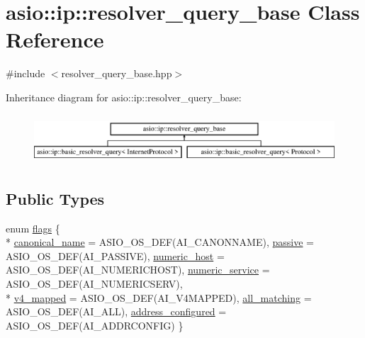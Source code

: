 \hypertarget{classasio_1_1ip_1_1resolver__query__base}{}\section{asio\+:\+:ip\+:\+:resolver\+\_\+query\+\_\+base Class Reference}
\label{classasio_1_1ip_1_1resolver__query__base}


{\ttfamily \#include $<$resolver\+\_\+query\+\_\+base.\+hpp$>$}

Inheritance diagram for asio\+:\+:ip\+:\+:resolver\+\_\+query\+\_\+base\+:\begin{figure}[H]
\begin{center}
\leavevmode
\includegraphics[height=1.860465cm]{classasio_1_1ip_1_1resolver__query__base}
\end{center}
\end{figure}
\subsection*{Public Types}
\begin{DoxyCompactItemize}
\item 
enum \hyperlink{classasio_1_1ip_1_1resolver__query__base_a458691242de07dc542fd9834f7b15cfe}{flags} \{ \\*
\hyperlink{classasio_1_1ip_1_1resolver__query__base_a458691242de07dc542fd9834f7b15cfea02d6078efc9d694dc98b8529d3649289}{canonical\+\_\+name} = A\+S\+I\+O\+\_\+\+O\+S\+\_\+\+D\+E\+F(A\+I\+\_\+\+C\+A\+N\+O\+N\+N\+A\+M\+E), 
\hyperlink{classasio_1_1ip_1_1resolver__query__base_a458691242de07dc542fd9834f7b15cfea2b72b18f2bf20dd05242e133e3a6cb79}{passive} = A\+S\+I\+O\+\_\+\+O\+S\+\_\+\+D\+E\+F(A\+I\+\_\+\+P\+A\+S\+S\+I\+V\+E), 
\hyperlink{classasio_1_1ip_1_1resolver__query__base_a458691242de07dc542fd9834f7b15cfea298ed0afafa60ec6218d6d9c8f227316}{numeric\+\_\+host} = A\+S\+I\+O\+\_\+\+O\+S\+\_\+\+D\+E\+F(A\+I\+\_\+\+N\+U\+M\+E\+R\+I\+C\+H\+O\+S\+T), 
\hyperlink{classasio_1_1ip_1_1resolver__query__base_a458691242de07dc542fd9834f7b15cfea7c911b858cf35654d565287b8ac8aa37}{numeric\+\_\+service} = A\+S\+I\+O\+\_\+\+O\+S\+\_\+\+D\+E\+F(A\+I\+\_\+\+N\+U\+M\+E\+R\+I\+C\+S\+E\+R\+V), 
\\*
\hyperlink{classasio_1_1ip_1_1resolver__query__base_a458691242de07dc542fd9834f7b15cfea7966b394def775a4131f53d90399b225}{v4\+\_\+mapped} = A\+S\+I\+O\+\_\+\+O\+S\+\_\+\+D\+E\+F(A\+I\+\_\+\+V4\+M\+A\+P\+P\+E\+D), 
\hyperlink{classasio_1_1ip_1_1resolver__query__base_a458691242de07dc542fd9834f7b15cfea9b8576dd131d1c201a1f97f38d4e24b9}{all\+\_\+matching} = A\+S\+I\+O\+\_\+\+O\+S\+\_\+\+D\+E\+F(A\+I\+\_\+\+A\+L\+L), 
\hyperlink{classasio_1_1ip_1_1resolver__query__base_a458691242de07dc542fd9834f7b15cfea72387a0c1a4eec494d376e28fefa7b8d}{address\+\_\+configured} = A\+S\+I\+O\+\_\+\+O\+S\+\_\+\+D\+E\+F(A\+I\+\_\+\+A\+D\+D\+R\+C\+O\+N\+F\+I\+G)
 \}
\end{DoxyCompactItemize}
